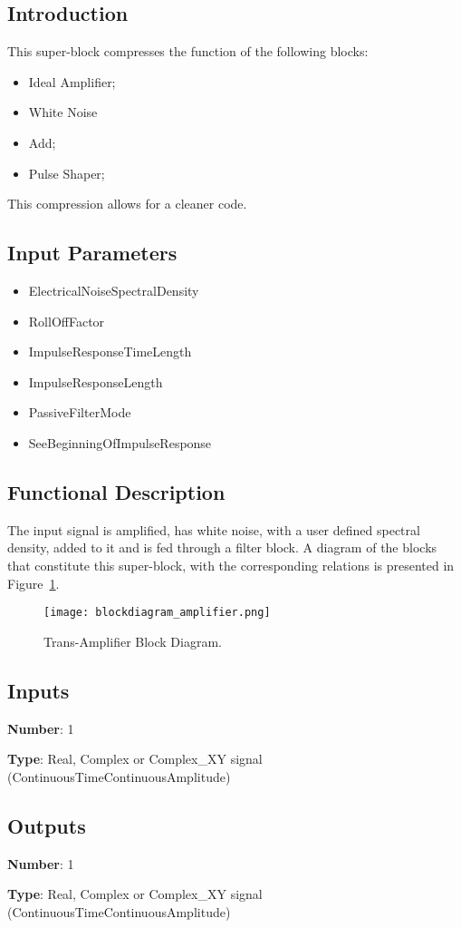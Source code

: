 \documentclass[../../sdf/tex/BPSK_system.tex]{subfiles}
\date{}
\begin{document}
\onlyinsubfile{\maketitle}

\subsection*{Introduction}

This super-block compresses the function of the following blocks:
\begin{itemize}
\item Ideal Amplifier;
\item White Noise
\item Add;
\item Pulse Shaper;
\end{itemize}
\noindent
This compression allows for a cleaner code. 

\subsection*{Input Parameters}

\begin{itemize}
	\item ElectricalNoiseSpectralDensity
	\item RollOffFactor
	\item ImpulseResponseTimeLength
	\item ImpulseResponseLength
	\item PassiveFilterMode
	\item SeeBeginningOfImpulseResponse
\end{itemize}

\subsection*{Functional Description}

The input signal is amplified, has white noise, with a user defined spectral density, added to it and is fed through a filter block. A diagram of the blocks that constitute this super-block, with the corresponding relations is presented in Figure~\ref{fig:physicalsystem}.

\begin{figure}[H]
\centering
\texttt{[image: blockdiagram\_amplifier.png]}
\caption{Trans-Amplifier Block Diagram.}
\label{fig:physicalsystem}
\end{figure}

\subsection*{Inputs}

\textbf{Number}: 1

\textbf{Type}: Real, Complex or Complex\_XY signal (ContinuousTimeContinuousAmplitude)

\subsection*{Outputs}

\textbf{Number}: 1

\textbf{Type}: Real, Complex or Complex\_XY signal (ContinuousTimeContinuousAmplitude)
\end{document}

